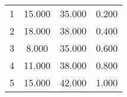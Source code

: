 % 
\begin{tabular}{cccc}
  \hline
  \hline
1 & 15.000 & 35.000 & 0.200 \\ 
  2 & 18.000 & 38.000 & 0.400 \\ 
  3 & 8.000 & 35.000 & 0.600 \\ 
  4 & 11.000 & 38.000 & 0.800 \\ 
  5 & 15.000 & 42.000 & 1.000 \\ 
   \hline
\end{tabular}

